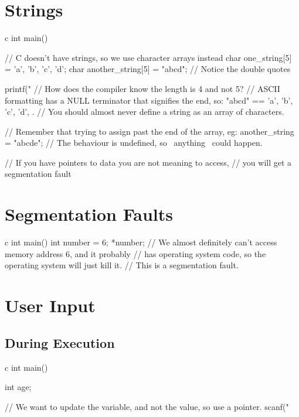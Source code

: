 \section{Strings}\label{sec:c_strings}

\begin{code}{c}
    int main() {
        // C doesn't have strings, so we use character arrays instead
        char one_string[5] = {'a', 'b', 'c', 'd'};
        char another_string[5] = "abcd"; // Notice the double quotes

        printf("%
        // How does the compiler know the length is 4 and not 5?
        // ASCII formatting has a NULL terminator that signifies the end, so:
        "abcd" == {'a', 'b', 'c', 'd', \0}.
        // You should almost never define a string as an array of characters.

        // Remember that trying to assign past the end of the array, eg:
        another_string = "abcde";
        // The behaviour is undefined, so ~anything~ could happen.
        
        // If you have pointers to data you are not meaning to access, 
        // you will get a segmentation fault
    }
\end{code}

\section{Segmentation Faults}\label{sec:segmentation_faults}

\begin{code}{c}
    int main() {
        int number = 6;
        *number;
        // We almost definitely can't access memory address 6, and it probably
        // has operating system code, so the operating system will just kill it.
        // This is a segmentation fault.
    }
\end{code}

\section{User Input}\label{sec:c_user_input}

\subsection{During Execution}\label{sub:during_execution}

\begin{code}{c}
    int main() {
        int age;

        // We want to update the variable, and not the value, so use a pointer.
        scanf("%
    }
\end{code}

